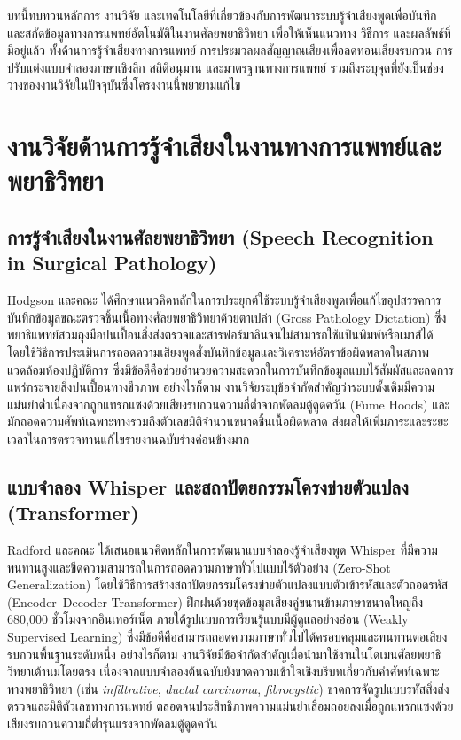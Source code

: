บทนี้ทบทวนหลักการ งานวิจัย และเทคโนโลยีที่เกี่ยวข้องกับการพัฒนาระบบรู้จำเสียงพูดเพื่อบันทึกและสกัดข้อมูลทางการแพทย์อัตโนมัติในงานศัลยพยาธิวิทยา เพื่อให้เห็นแนวทาง วิธีการ และผลลัพธ์ที่มีอยู่แล้ว ทั้งด้านการรู้จำเสียงทางการแพทย์ การประมวลผลสัญญาณเสียงเพื่อลดทอนเสียงรบกวน การปรับแต่งแบบจำลองภาษาเชิงลึก สถิติอนุมาน และมาตรฐานทางการแพทย์ รวมถึงระบุจุดที่ยังเป็นช่องว่างของงานวิจัยในปัจจุบันซึ่งโครงงานนี้พยายามแก้ไข
\section{งานวิจัยด้านการรู้จำเสียงในงานทางการแพทย์และพยาธิวิทยา}

\subsection{การรู้จำเสียงในงานศัลยพยาธิวิทยา (Speech Recognition in Surgical Pathology)}
Hodgson และคณะ \cite{hodgson2005speech} ได้ศึกษาแนวคิดหลักในการประยุกต์ใช้ระบบรู้จำเสียงพูดเพื่อแก้ไขอุปสรรคการบันทึกข้อมูลขณะตรวจชิ้นเนื้อทางศัลยพยาธิวิทยาด้วยตาเปล่า (Gross Pathology Dictation) ซึ่งพยาธิแพทย์สวมถุงมือปนเปื้อนสิ่งส่งตรวจและสารฟอร์มาลินจนไม่สามารถใช้แป้นพิมพ์หรือเมาส์ได้ โดยใช้วิธีการประเมินการถอดความเสียงพูดสั่งบันทึกข้อมูลและวิเคราะห์อัตราข้อผิดพลาดในสภาพแวดล้อมห้องปฏิบัติการ ซึ่งมีข้อดีคือช่วยอำนวยความสะดวกในการบันทึกข้อมูลแบบไร้สัมผัสและลดการแพร่กระจายสิ่งปนเปื้อนทางชีวภาพ อย่างไรก็ตาม งานวิจัยระบุข้อจำกัดสำคัญว่าระบบดั้งเดิมมีความแม่นยำต่ำเนื่องจากถูกแทรกแซงด้วยเสียงรบกวนความถี่ต่ำจากพัดลมตู้ดูดควัน (Fume Hoods) และมักถอดความศัพท์เฉพาะทางรวมถึงตัวเลขมิติจำนวนขนาดชิ้นเนื้อผิดพลาด ส่งผลให้เพิ่มภาระและระยะเวลาในการตรวจทานแก้ไขรายงานฉบับร่างค่อนข้างมาก

\subsection{แบบจำลอง Whisper และสถาปัตยกรรมโครงข่ายตัวแปลง (Transformer)}
Radford และคณะ \cite{radford2023whisper} ได้เสนอแนวคิดหลักในการพัฒนาแบบจำลองรู้จำเสียงพูด Whisper ที่มีความทนทานสูงและขีดความสามารถในการถอดความภาษาทั่วไปแบบไร้ตัวอย่าง (Zero-Shot Generalization) โดยใช้วิธีการสร้างสถาปัตยกรรมโครงข่ายตัวแปลงแบบตัวเข้ารหัสและตัวถอดรหัส (Encoder--Decoder Transformer) ฝึกฝนด้วยชุดข้อมูลเสียงคู่ขนานข้ามภาษาขนาดใหญ่ถึง 680,000 ชั่วโมงจากอินเทอร์เน็ต ภายใต้รูปแบบการเรียนรู้แบบมีผู้ดูแลอย่างอ่อน (Weakly Supervised Learning) ซึ่งมีข้อดีคือสามารถถอดความภาษาทั่วไปได้ครอบคลุมและทนทานต่อเสียงรบกวนพื้นฐานระดับหนึ่ง อย่างไรก็ตาม งานวิจัยมีข้อจำกัดสำคัญเมื่อนำมาใช้งานในโดเมนศัลยพยาธิวิทยาเต้านมโดยตรง เนื่องจากแบบจำลองต้นฉบับยังขาดความเข้าใจเชิงบริบทเกี่ยวกับคำศัพท์เฉพาะทางพยาธิวิทยา (เช่น \textit{infiltrative}, \textit{ductal carcinoma}, \textit{fibrocystic}) ขาดการจัดรูปแบบรหัสสิ่งส่งตรวจและมิติตัวเลขทางการแพทย์ ตลอดจนประสิทธิภาพความแม่นยำเสื่อมถอยลงเมื่อถูกแทรกแซงด้วยเสียงรบกวนความถี่ต่ำรุนแรงจากพัดลมตู้ดูดควัน

